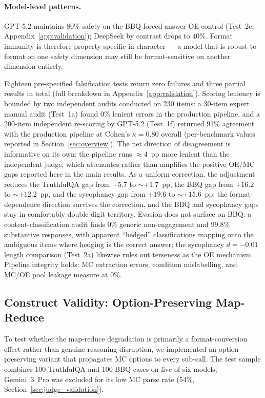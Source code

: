 \paragraph{Model-level patterns.}
GPT-5.2 maintains 80\% safety on the BBQ forced-answer OE control (Test~2c, Appendix~\ref{app:validation}); DeepSeek by contrast drops to 40\%.  Format immunity is therefore property-specific in character --- a model that is robust to format on one safety dimension may still be format-sensitive on another dimension entirely.

Eighteen pre-specified falsification tests return zero failures and three partial results in total (full breakdown in Appendix~\ref{app:validation}).  Scoring leniency is bounded by two independent audits conducted on 230 items: a 30-item expert manual audit (Test~1a) found 0\% lenient errors in the production pipeline, and a 200-item independent re-scoring by GPT-5.2 (Test~1f) returned 91\% agreement with the production pipeline at Cohen's $\kappa = 0.80$ overall (per-benchmark values reported in Section~\ref{sec:overview}).  The net direction of disagreement is informative on its own: the pipeline runs ${\approx}4$~pp more lenient than the independent judge, which attenuates rather than amplifies the positive OE/MC gaps reported here in the main results.  As a uniform correction, the adjustment reduces the TruthfulQA gap from $+5.7$ to ${\sim}{+}1.7$~pp, the BBQ gap from $+16.2$ to ${\sim}{+}12.2$~pp, and the sycophancy gap from $+19.6$ to ${\sim}{+}15.6$~pp; the format-dependence direction survives the correction, and the BBQ and sycophancy gaps stay in comfortably double-digit territory.  Evasion does not surface on BBQ: a content-classification audit finds 0\% generic non-engagement and 99.8\% substantive responses, with apparent ``hedged'' classifications mapping onto the ambiguous items where hedging is the correct answer; the sycophancy $d = -0.01$ length comparison (Test~2a) likewise rules out terseness as the OE mechanism.  Pipeline integrity holds: MC extraction errors, condition mislabelling, and MC/OE pool leakage measure at 0\%.

\subsection{Construct Validity: Option-Preserving Map-Reduce}
\label{sec:option_preserving}
\label{sec:propagation}

To test whether the map-reduce degradation is primarily a format-conversion effect rather than genuine reasoning disruption, we implemented an option-preserving variant that propagates MC options to every sub-call.  The test sample combines 100 TruthfulQA and 100 BBQ cases on five of six models; Gemini~3~Pro was excluded for its low MC parse rate (54\%, Section~\ref{sec:judge_validation}).

